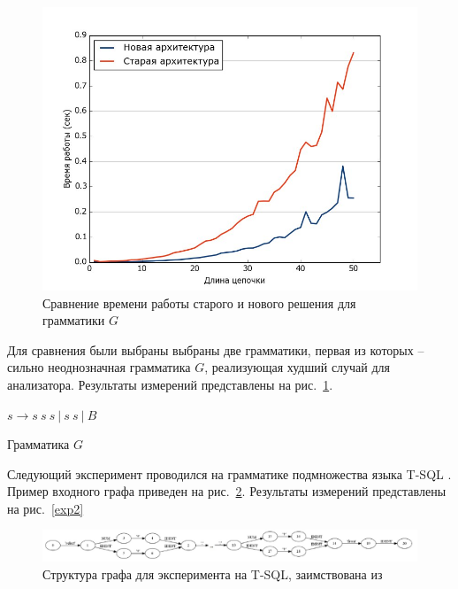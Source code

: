 \documentclass[14pt]{matmex-diploma}
\begin{document}
\begin{figure}[H]
 \includegraphics[width=\textwidth]{images/BBB.jpg}
 \caption{Сравнение времени работы старого и нового решения для грамматики $G$}
 \label{exp1}
\end{figure}
Для сравнения были выбраны выбраны две грамматики, первая из которых -- сильно неоднозначная грамматика $G$, реализующая худший случай для анализатора. Результаты измерений представлены на рис.~\ref{exp1}.

\begin{center}
\begin{listing}
$s \rightarrow s \ s \ s \ |  \ s \ s \ | \ B$
\label{grmG}
\caption{Грамматика $G$}
\end{listing}
\end{center}

Следующий эксперимент проводился на грамматике подмножества языка T-SQL \cite{GrammarZoo}. Пример входного графа приведен на рис.~\ref{sqlInput}. Результаты измерений представлены на рис.~\ref{exp2}

\begin{figure}[H]
 \includegraphics[width=\textwidth]{images/SQLInput.pdf}
 \caption{Структура графа для эксперимента на T-SQL, заимствована из \cite{graphParseRag}}
 \label{sqlInput}
\end{figure}
\end{document}
